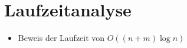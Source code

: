 \section{Laufzeitanalyse}

\begin{itemize}
	\item Beweis der Laufzeit von $O((n+m)\log n)$
\end{itemize}